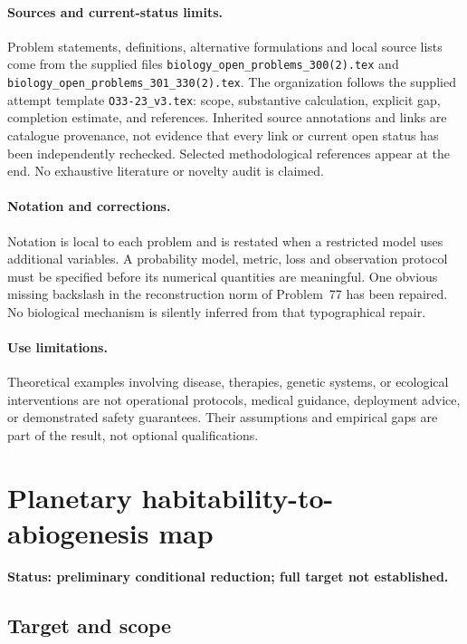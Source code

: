 \documentclass[11pt]{article}
\begin{document}
\paragraph{Sources and current-status limits.}
Problem statements, definitions, alternative formulations and local source lists
come from the supplied files
\texttt{biology\_open\_problems\_300(2).tex} and
\texttt{biology\_open\_problems\_301\_330(2).tex}.
The organization follows the supplied attempt template
\texttt{O33-23\_v3.tex}: scope, substantive calculation, explicit gap,
completion estimate, and references. Inherited source annotations and links are
catalogue provenance, not evidence that every link or current open status has
been independently rechecked. Selected methodological references appear at the
end. No exhaustive literature or novelty audit is claimed.

\paragraph{Notation and corrections.}
Notation is local to each problem and is restated when a restricted model uses
additional variables. A probability model, metric, loss and observation protocol
must be specified before its numerical quantities are meaningful. One obvious
missing backslash in the reconstruction norm of Problem~77 has been repaired.
No biological mechanism is silently inferred from that typographical repair.

\paragraph{Use limitations.}
Theoretical examples involving disease, therapies, genetic systems, or ecological
interventions are not operational protocols, medical guidance, deployment advice,
or demonstrated safety guarantees. Their assumptions and empirical gaps are part
of the result, not optional qualifications.


\section*{Planetary habitability-to-abiogenesis map}
\label{prob:299}
\noindent\textbf{Status: preliminary conditional reduction; full target not established.}
\subsection{Target and scope}
\end{document}
